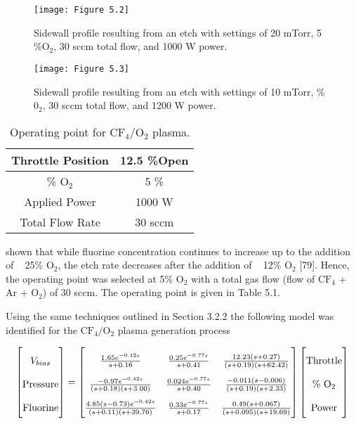 \begin{figure}[H]
	\centering
	\texttt{[image: Figure 5.2]}
	\bf\caption{  Sidewall profile resulting from an etch with settings of 20 mTorr,
		5 \%$\text{O}_{2}$, 30 sccm total flow, and 1000 W power.}
	\label{fig:5.2}
\end{figure}

\begin{figure}[H]
	\centering
	\texttt{[image: Figure 5.3]}
	\bf\caption{  Sidewall profile resulting from an etch with settings of 10 mTorr,
		\%$\text{0}_{2}$, 30 sccm total flow, and 1200 W power.}
	\label{fig:5.3}
\end{figure}

\begin{table}[H]
	\centering
	\renewcommand\arraystretch{1.5}
	\begin{tabular}{|c|c|}
		\hline
		Throttle Position & 12.5 \%Open \\
		\hline
		\% $\text{O}_{2}$ & 5 \% \\
		\hline
		Applied Power & 1000 W \\
		\hline
		Total Flow Rate & 30 sccm \\
		\hline
	\end{tabular}
	\bf\caption{ Operating point for $\text{CF}_{4}$/$\text{O}_{2}$ plasma.}
	\label{table:5.1}
\end{table}

\noindent shown that while fluorine concentration continues to increase up to the addition of ~ 25\% $\text{O}_{2}$, the etch rate decreases after the addition of ~ 12\% $\text{O}_{2}$ [79]. Hence, the operating point was selected at 5\% $\text{O}_{2}$ with a total gas flow (flow of $\text{CF}_{4}$ + Ar + $\text{O}_{2}$) of 30 sccm. The operating point is given in Table 5.1.

Using the same techniques outlined in Section 3.2.2 the following model was identified
for the $\text{CF}_{4}/\text{O}_{2}$ plasma generation process

\begin{align}
	\renewcommand\arraystretch{2}\begin{bmatrix}
		V_{bias} \\ \text{Pressure} \\ \text{Fluorine}
	\end{bmatrix} = 
	\renewcommand\arraystretch{2}\begin{bmatrix}
		\frac{1.65e^{-0.42s}}{s+0.16} & \frac{0.25e^{-0.77s}}{s+0.41} & \frac{12.23(s+0.27)}{(s+0.19)(s+62.42)} \\
		\frac{-0.97e^{-0.42s}}{(s+0.18)(s+3.00)} & \frac{0.024e^{-0.77s}}{s+0.40} & \frac{-0.011(s-0.006)}{(s+0.19)(s+2.33)} \\
		\frac{4.85(s-0.73)e^{-0.42s}}{(s+0.11)(s+39.76)} & \frac{0.33e^{-0.77s}}{s+0.17} & \frac{0.49(s+0.067)}{(s+0.095)(s+19.69)}
	\end{bmatrix}
	\renewcommand\arraystretch{2}\begin{bmatrix}
		\text{Throttle} \\ \text{\% O}_{2} \\ \text{Power}
	\end{bmatrix}
\end{align}

